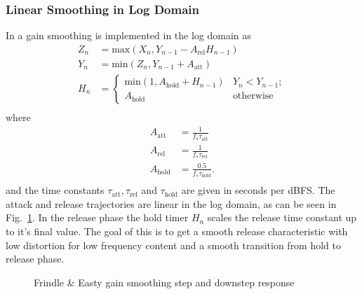 \documentclass[../main2.tex]{subfiles}
\providecommand{\rootdir}{..}
\begin{document}
\subsubsection{Linear Smoothing in Log Domain}
In \cite{frindle1996implementation} a gain smoothing is implemented in the log domain as
\begin{equation}
\begin{split}
Z_n &= \text{max}(X_n, Y_{n-1} - A_{\text{rel}} H_{n-1} )\\
Y_n &= \text{min}(Z_n, Y_{n-1} + A_{\text{att}}) \\
H_n &=
\begin{cases}
    \text{min}(1,A_{\text{hold}} + H_{n-1})	& Y_n < Y_{n-1}; \\
    A_{\text{hold}}					& \text{otherwise}
\end{cases} \\
\end{split}
\end{equation}
where
\begin{equation}
\begin{split}
A_{\text{att}} &= \frac{1}{f_s \tau_{\text{att}}} \\
A_{\text{rel}} &= \frac{1}{f_s \tau_{\text{rel}}} \\
A_{\text{hold}} &= \frac{0.5}{f_s \tau_{\text{hold}}}. \\
\end{split}
\end{equation}
and the time constants $\tau_{\text{att}}, \tau_{\text{rel}}$ and $\tau_{\text{hold}}$ are given in seconds per dBFS. The attack and release trajectories are linear in the log domain, as can be seen in Fig.~\ref{fig:step_frindle_gain}. In the release phase the hold timer $H_n$ scales the release time constant up to it's final value. The goal of this is to get a smooth release characteristic with low distortion for low frequency content and a smooth transition from hold to release phase.
\begin{figure}[h]
\centerline{}
\caption{Frindle \& Easty gain smoothing step and downstep response}
\label{fig:step_frindle_gain}
\end{figure}
\end{document}
